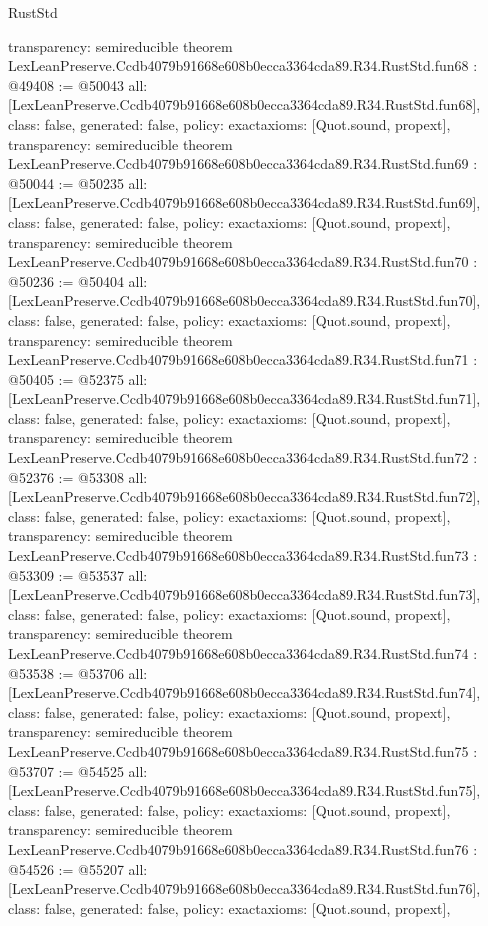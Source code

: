 \begin{lexlean}{RustStd}
\begin{coremodule}
{  transparency: semireducible
}
theorem LexLeanPreserve.Ccdb4079b91668e608b0ecca3364cda89.R34.RustStd.fun68 : @49408 := @50043 {
  all: [LexLeanPreserve.Ccdb4079b91668e608b0ecca3364cda89.R34.RustStd.fun68],
  class: false,
  generated: false,
  policy: exact{axioms: [Quot.sound, propext]},
  transparency: semireducible
}
theorem LexLeanPreserve.Ccdb4079b91668e608b0ecca3364cda89.R34.RustStd.fun69 : @50044 := @50235 {
  all: [LexLeanPreserve.Ccdb4079b91668e608b0ecca3364cda89.R34.RustStd.fun69],
  class: false,
  generated: false,
  policy: exact{axioms: [Quot.sound, propext]},
  transparency: semireducible
}
theorem LexLeanPreserve.Ccdb4079b91668e608b0ecca3364cda89.R34.RustStd.fun70 : @50236 := @50404 {
  all: [LexLeanPreserve.Ccdb4079b91668e608b0ecca3364cda89.R34.RustStd.fun70],
  class: false,
  generated: false,
  policy: exact{axioms: [Quot.sound, propext]},
  transparency: semireducible
}
theorem LexLeanPreserve.Ccdb4079b91668e608b0ecca3364cda89.R34.RustStd.fun71 : @50405 := @52375 {
  all: [LexLeanPreserve.Ccdb4079b91668e608b0ecca3364cda89.R34.RustStd.fun71],
  class: false,
  generated: false,
  policy: exact{axioms: [Quot.sound, propext]},
  transparency: semireducible
}
theorem LexLeanPreserve.Ccdb4079b91668e608b0ecca3364cda89.R34.RustStd.fun72 : @52376 := @53308 {
  all: [LexLeanPreserve.Ccdb4079b91668e608b0ecca3364cda89.R34.RustStd.fun72],
  class: false,
  generated: false,
  policy: exact{axioms: [Quot.sound, propext]},
  transparency: semireducible
}
theorem LexLeanPreserve.Ccdb4079b91668e608b0ecca3364cda89.R34.RustStd.fun73 : @53309 := @53537 {
  all: [LexLeanPreserve.Ccdb4079b91668e608b0ecca3364cda89.R34.RustStd.fun73],
  class: false,
  generated: false,
  policy: exact{axioms: [Quot.sound, propext]},
  transparency: semireducible
}
theorem LexLeanPreserve.Ccdb4079b91668e608b0ecca3364cda89.R34.RustStd.fun74 : @53538 := @53706 {
  all: [LexLeanPreserve.Ccdb4079b91668e608b0ecca3364cda89.R34.RustStd.fun74],
  class: false,
  generated: false,
  policy: exact{axioms: [Quot.sound, propext]},
  transparency: semireducible
}
theorem LexLeanPreserve.Ccdb4079b91668e608b0ecca3364cda89.R34.RustStd.fun75 : @53707 := @54525 {
  all: [LexLeanPreserve.Ccdb4079b91668e608b0ecca3364cda89.R34.RustStd.fun75],
  class: false,
  generated: false,
  policy: exact{axioms: [Quot.sound, propext]},
  transparency: semireducible
}
theorem LexLeanPreserve.Ccdb4079b91668e608b0ecca3364cda89.R34.RustStd.fun76 : @54526 := @55207 {
  all: [LexLeanPreserve.Ccdb4079b91668e608b0ecca3364cda89.R34.RustStd.fun76],
  class: false,
  generated: false,
  policy: exact{axioms: [Quot.sound, propext]},
}
\end{coremodule}
\end{lexlean}
